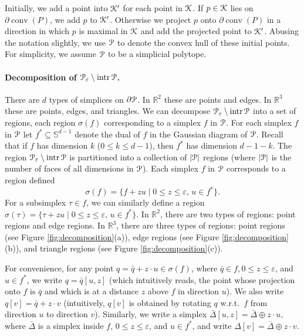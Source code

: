 \documentclass[11pt]{myclass}
\newcommand{\eps}{\varepsilon}
\renewcommand{\b}[1]{\ensuremath{\mathbb{#1}}}
\def\kernel{\EuScript{K}}
\newcommand{\conv}[1]{\mathop{\mathrm{conv}}(#1)}
\newcommand{\dual}[1]{{#1}^*}
\newcommand{\polyt}{\EuScript{P}}
\newcommand{\intr}{\mathop{\mathrm{intr}}}
\newcommand{\fq}{\bar{q}}
\newcommand{\fDelta}{\bar{\Delta}}
\newcommand{\point}[3]{{#1}[#3,#2]}
\newcommand{\rotate}[2]{{#1}[#2]}
\begin{document}
Initially, we add a point into $\kernel'$ for each point in $\kernel$.  If $p \in \kernel$ lies on $\partial \conv{P}$, we add $p$ to $\kernel'$.  Otherwise we project $p$ onto $\partial \conv{P}$ in a direction in which $p$ is maximal in $\kernel$ and add the projected point to $\kernel'$.  Abusing the notation slightly, we use $\polyt$ to denote the convex hull of these initial points.  
For simplicity, we assume $\polyt$ to be a simplicial polytope. 


\paragraph{Decomposition of $\polyt_\eps \setminus \intr \polyt$.}
There are $d$ types of simplices on $\partial \polyt$.  In $\b{R}^2$ these are points and edges.  In $\b{R}^3$ these are points, edges, and triangles.  We can decompose $\polyt_\eps \setminus \intr \polyt$ into a set of regions, each region $\sigma(f)$ corresponding to a simplex $f$ in $\polyt$.  For each simplex $f$ in $\polyt$ let $\dual{f} \subseteq \b{S}^{d-1}$ denote the dual of $f$ in the Gaussian diagram of $\polyt$.  
Recall that if $f$ has dimension $k$ ($0 \leq k \leq d-1$), then $\dual{f}$ has dimension $d-1-k$.  
The region $\polyt_\eps \setminus \intr \polyt$ is partitioned into a collection of $|\polyt|$ regions (where $|\polyt|$ is the number of faces of all dimensions in $\polyt$).  Each simplex $f$ in $\polyt$ corresponds to a region defined
$$
\sigma(f) = \{ f + z u \mid 0 \leq z \leq \eps,\, u \in \dual{f}\}.
$$
For a subsimplex $\tau \in f$, we can similarly define a region 
$
\sigma(\tau) = \{\tau + zu \mid 0 \leq z \leq \eps,\, u\in \dual{f}\}.
$
In $\b{R}^2$, there are two types of regions: point regions and edge regions.  
In $\b{R}^3$, there are three types of regions: point regions (see Figure \ref{fig:decomposition}(a)), edge regions (see Figure \ref{fig:decomposition}(b)), and triangle regions (see Figure \ref{fig:decomposition}(c)).  

For convenience, for any point $q =\fq + z\cdot u \in \sigma(f)$, where $\fq\in f, 0\leq z\leq \eps$, and $u\in \dual{f}$, we write $q = \point{\fq}{z}{u}$ (which intuitively reads, the point whose projection onto $f$ is $\fq$ and which is at a distance $z$ above $f$ in direction $u$). 
We also write $\rotate{q}{v} = \fq+z\cdot v$ (intuitively, $\rotate{q}{v}$ is obtained by rotating $q$ w.r.t.~$f$ from direction $u$ to direction $v$).
Similarly, we write a simplex $\point{\fDelta}{z}{u}=\fDelta \oplus z\cdot u$, where $\fDelta$ is a simplex inside $f$, $0\leq z\leq \eps$, and $u\in \dual{f}$, and write $\rotate{\Delta}{v} = \fDelta \oplus z\cdot v$. 
\end{document}
